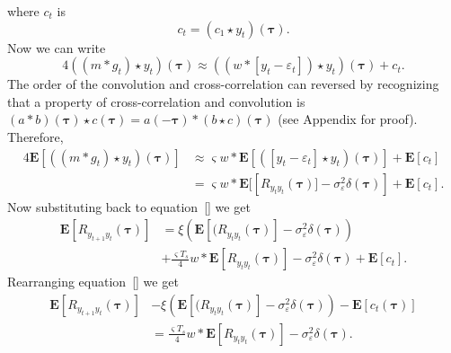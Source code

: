 \documentclass[conference,onecolumn]{IEEEtran}
\begin{document}
where $c_t$ is 
\begin{equation}
	c_t = (c_1 \star y_t)(\boldsymbol\tau).
\end{equation}
Now we can write
\begin{equation}
4((m \ast g_t) \star y_t)(\boldsymbol\tau) \approx (( w \ast \left[y_t-\varepsilon_t \right] ) \star y_t)(\boldsymbol\tau) + c_t.
\end{equation}
The order of the convolution and cross-correlation can reversed by recognizing that a property of cross-correlation and convolution is $(a \ast b)(\boldsymbol\tau) \star c(\boldsymbol\tau) = a(-\boldsymbol\tau)\ast(b \star c)(\boldsymbol\tau)$ (see Appendix for proof). Therefore,
\begin{align}
4\mathbf{E}[((m \ast g_t) \star y_t)(\boldsymbol\tau)] &\approx \varsigma w \ast \mathbf{E}[(\left[y_t-\varepsilon_t \right]\star y_t ) (\boldsymbol\tau)] + \mathbf{E}[c_t] \\ 
&= \varsigma w \ast \mathbf{E}[\left[R_{y_ty_t}(\boldsymbol\tau)] - \sigma_{\varepsilon}^2 \delta(\boldsymbol\tau) \right] + \mathbf{E}[c_t].
\end{align}
Now substituting back to equation~\ref{} we get
\begin{align}
	\mathbf{E}[R_{y_{t+1}y_t}(\boldsymbol{\tau})] &= \xi\left(\mathbf{E}[ (R_{y_ty_t}(\boldsymbol{\tau})] - \sigma_{\varepsilon}^2 \delta(\boldsymbol{\tau})\right) \nonumber \\
	&+ \frac{\varsigma T_s}{4}w \ast \mathbf{E}\left[R_{y_ty_t}(\boldsymbol\tau)\right] - \sigma_{\varepsilon}^2 \delta(\boldsymbol\tau)  + \mathbf{E}\left[c_t\right].
\end{align}
Rearranging equation~\ref{} we get
\begin{align}
	\mathbf{E}[R_{y_{t+1}y_t}(\boldsymbol{\tau})] &- \xi\left(\mathbf{E}[ (R_{y_ty_t}(\boldsymbol{\tau})] - \sigma_{\varepsilon}^2 \delta(\boldsymbol{\tau})\right) - \mathbf{E}\left[c_t(\boldsymbol\tau)\right] \nonumber \\
	&= \frac{\varsigma T_s}{4}w \ast \mathbf{E}\left[R_{y_ty_t}(\boldsymbol\tau)\right] - \sigma_{\varepsilon}^2 \delta(\boldsymbol\tau).
\end{align}
\end{document}
